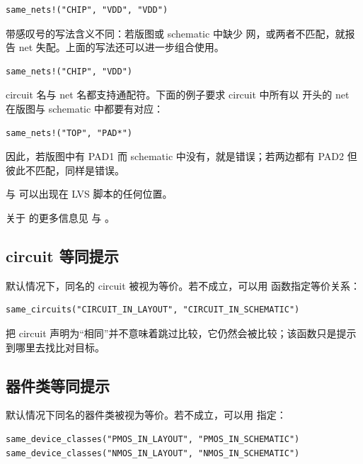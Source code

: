 \begin{lstlisting}
same_nets!("CHIP", "VDD", "VDD")
\end{lstlisting}

带感叹号的写法含义不同：若版图或 schematic 中缺少  网，或两者不匹配，就报告 net 失配。上面的写法还可以进一步组合使用。

\begin{lstlisting}
same_nets!("CHIP", "VDD")
\end{lstlisting}

circuit 名与 net 名都支持通配符。下面的例子要求  circuit 中所有以  开头的 net 在版图与 schematic 中都要有对应：

\begin{lstlisting}
same_nets!("TOP", "PAD*")
\end{lstlisting}

因此，若版图中有 PAD1 而 schematic 中没有，就是错误；若两边都有 PAD2 但彼此不匹配，同样是错误。

 与  可以出现在 LVS 脚本的任何位置。

关于  的更多信息见  与 。

\subsection{circuit 等同提示}

默认情况下，同名的 circuit 被视为等价。若不成立，可以用  函数指定等价关系：

\begin{lstlisting}
same_circuits("CIRCUIT_IN_LAYOUT", "CIRCUIT_IN_SCHEMATIC")
\end{lstlisting}

把 circuit 声明为“相同”并不意味着跳过比较，它仍然会被比较；该函数只是提示到哪里去找比对目标。

\subsection{器件类等同提示}

默认情况下同名的器件类被视为等价。若不成立，可以用  指定：

\begin{lstlisting}
same_device_classes("PMOS_IN_LAYOUT", "PMOS_IN_SCHEMATIC") same_device_classes("NMOS_IN_LAYOUT", "NMOS_IN_SCHEMATIC")
\end{lstlisting}

